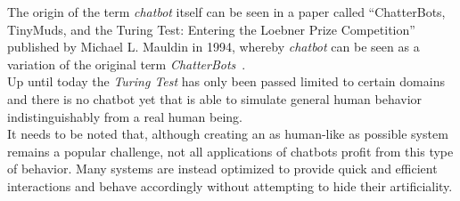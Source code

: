 The origin of the term \emph{chatbot} itself can be seen in a paper called ``ChatterBots, TinyMuds, and the Turing Test: Entering the Loebner Prize Competition'' published by Michael L. Mauldin in 1994, whereby \emph{chatbot} can be seen as a variation of the original term \emph{ChatterBots}~\cite{aiconf}.
\\

Up until today the \emph{Turing Test} has only been passed limited to certain domains and there is no chatbot yet that is able to simulate general human behavior indistinguishably from a real human being.
\\
It needs to be noted that, although creating an as human-like as possible system remains a popular challenge, not all applications of chatbots profit from this type of behavior.
Many systems are instead optimized to provide quick and efficient interactions and behave accordingly without attempting to hide their artificiality.
